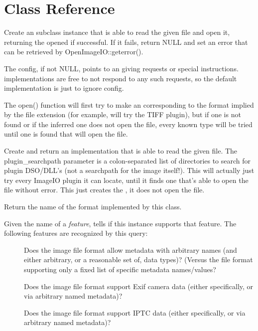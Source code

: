 \newpage
\section{\ImageInput Class Reference}
\label{sec:imageinput:reference}

Create an \ImageInput subclass instance that is able to read
the given file and open it, returning the opened \ImageInput if
successful.  If it fails, return {\cf NULL} and set an error that can
be retrieved by {\cf OpenImageIO::geterror()}.
    
The {\cf config}, if not {\cf NULL}, points to an \ImageSpec giving
requests or special instructions.  \ImageInput implementations
are free to not respond to any such requests, so the default
implementation is just to ignore config.
    
The {\cf open()} function will first try to make an \ImageInput
corresponding to the format implied by the file extension (for example,
 will try the TIFF plugin), but if one is not found or if
the inferred one does not open the file, every known \ImageInput type
will be tried until one is found that will open the file.
\apiend


Create and return an \ImageInput implementation that is able
to read the given file.  The {\kw plugin_searchpath} parameter is a
colon-separated list of directories to search for \product plugin
DSO/DLL's (not a searchpath for the image itself!).  This will
actually just try every ImageIO plugin it can locate, until it
finds one that's able to open the file without error.  This just
creates the \ImageInput, it does not open the file.
\apiend

Return the name of the format implemented by this class.
\apiend

\label{sec:inputsupportsfeaturelist}
Given the name of a \emph{feature}, tells if this \ImageInput 
instance supports that feature.  The following features are recognized
by this query:
\begin{description}
\item[\spc] \spc
\item[\rm {}] Does the image file format allow
  metadata with arbitrary names (and either arbitrary, or a reasonable set
  of, data types)? (Versus the file format supporting only a fixed list of
  specific metadata names/values?
\item[\rm {}] Does the image file format support Exif camera data
  (either specifically, or via arbitrary named metadata)?
\item[\rm {}] Does the image file format support IPTC data
  (either specifically, or via arbitrary named metadata)?
  \end{description}
\apiend

